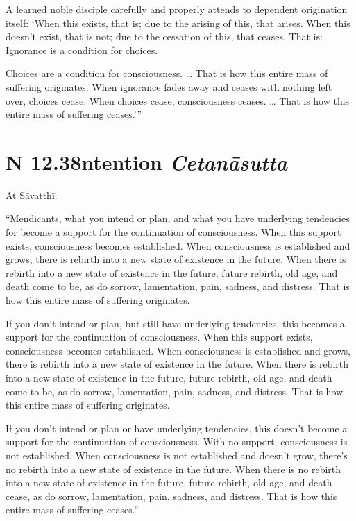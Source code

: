 \documentclass[12pt,openany]{book}%
\newcommand*{\suttatitleacronym}[1]{\smaller[2]{#1}\vspace*{.3em}}
\newcommand*{\suttatitletranslation}[1]{\linebreak{#1}}
\newcommand*{\suttatitleroot}[1]{\linebreak\smaller[2]\itshape{#1}}
\newcommand*{\tocacronym}[1]{\hspace*{-3.3em}{#1}\quad}
\newcommand*{\toctranslation}[1]{#1}
\newcommand*{\tocroot}[1]{(\textit{#1})}
\begin{document}
A learned noble disciple carefully and properly attends to dependent origination itself: ‘When this exists, that is; due to the arising of this, that arises. When this doesn’t exist, that is not; due to the cessation of this, that ceases. That is: Ignorance is a condition for choices. 

Choices are a condition for consciousness. … That is how this entire mass of suffering originates. When ignorance fades away and ceases with nothing left over, choices cease. When choices cease, consciousness ceases. … That is how this entire mass of suffering ceases.’” 

%
\section*{{\suttatitleacronym SN 12.38}{\suttatitletranslation Intention }{\suttatitleroot Cetanāsutta}}
\addcontentsline{toc}{section}{\tocacronym{SN 12.38} \toctranslation{Intention } \tocroot{Cetanāsutta}}

At \textsanskrit{Sāvatthī}. 

“Mendicants, what you intend or plan, and what you have underlying tendencies for become a support for the continuation of consciousness. When this support exists, consciousness becomes established. When consciousness is established and grows, there is rebirth into a new state of existence in the future. When there is rebirth into a new state of existence in the future, future rebirth, old age, and death come to be, as do sorrow, lamentation, pain, sadness, and distress. That is how this entire mass of suffering originates. 

If you don’t intend or plan, but still have underlying tendencies, this becomes a support for the continuation of consciousness. When this support exists, consciousness becomes established. When consciousness is established and grows, there is rebirth into a new state of existence in the future. When there is rebirth into a new state of existence in the future, future rebirth, old age, and death come to be, as do sorrow, lamentation, pain, sadness, and distress. That is how this entire mass of suffering originates. 

If you don’t intend or plan or have underlying tendencies, this doesn’t become a support for the continuation of consciousness. With no support, consciousness is not established. When consciousness is not established and doesn’t grow, there’s no rebirth into a new state of existence in the future. When there is no rebirth into a new state of existence in the future, future rebirth, old age, and death cease, as do sorrow, lamentation, pain, sadness, and distress. That is how this entire mass of suffering ceases.” 
\end{document}
